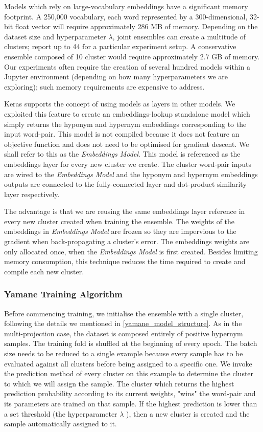 Models which rely on large-vocabulary embeddings have a significant memory footprint.  A 250,000 vocabulary, each word represented by a 300-dimensional, 32-bit float vector will require approximately 286 MB of memory.  Depending on the dataset size and hyperparameter $\lambda$, joint ensembles can create a multitude of clusters;  \citep{yamane2016distributional} report up to 44 for a particular experiment setup.
A conservative ensemble composed of 10 cluster would require approximately 2.7 GB of memory.  Our experiments often require the creation of several hundred models within a Jupyter environment (depending on how many hyperparameters we are exploring); such memory requirements are expensive to address.

Keras supports the concept of using models as layers in other models.  We exploited this feature to create an embeddings-lookup standalone model which simply returns the hyponym and hypernym embeddings corresponding to the input word-pair.  This model is not compiled because it does not feature an objective function and does not need to be optimised for gradient descent. We shall refer to this as the \textit{Embeddings Model}.  This model is referenced as the embeddings layer for every new cluster we create.  The cluster word-pair inputs are wired to the \textit{Embeddings Model} and the hyponym and hypernym embeddings outputs are connected to the fully-connected layer and dot-product similarity layer respectively.

The advantage is that we are reusing the same embeddings layer reference in every new cluster created when training the ensemble.  The weights of the embeddings in \textit{Embeddings Model} are frozen so they are impervious to the gradient when back-propagating a cluster's error.  The embeddings weights are only allocated once, when the \textit{Embeddings Model} is first created.  Besides limiting memory consumption, this technique reduces the time required to create and compile each new cluster.

\subsubsection{Yamane Training Algorithm}
Before commencing training, we initialise the ensemble with a single cluster, following the details we mentioned in \cref{yamane_model_structure}.  As in the multi-projection case, the dataset is composed entirely of positive hypernym samples.  The training fold is shuffled at the beginning of every epoch.  The batch size needs to be reduced to a single example because every sample has to be evaluated against all clusters before being assigned to a specific one.  We invoke the prediction method of every cluster on this example to determine the cluster to which we will assign the sample.  The cluster which returns the highest prediction probability according to its current weights, "wins" the word-pair and its parameters are trained on that sample.  If the highest prediction is lower than a set threshold (the hyperparameter $\lambda$ ), then a new cluster is created and the sample automatically assigned to it.

